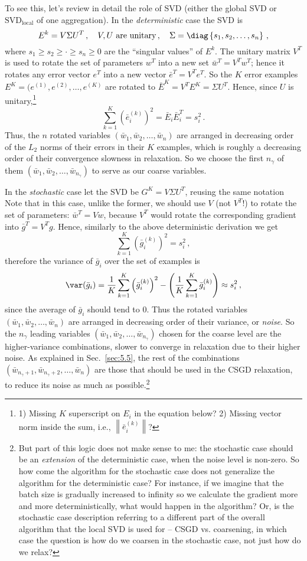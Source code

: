 \documentclass{article} %
\begin{document}
To see this, let's review in detail the role of SVD (either the global SVD or $\text{SVD}_{\text{local}}$ of one aggregation). In the {\it deterministic} case the SVD is
$$ E^k = V \Sigma U^T\,,\quad V, U \text{ are unitary}\,,\quad \Sigma = \diag\left\{s_1, s_2, \dots, s_n \right\}\,,$$
where $s_1 \geq s_2 \geq \cdot \geq s_n \geq 0$ are the ``singular values'' of $E^k$. The unitary matrix $V^T$ is used to rotate the set of parameters $w^T$ into a new set $\bar{w}^T = V^T w^T$; hence it rotates any error vector $e^T$ into a new vector $\bar{e}^T = V^T e^T$. So the $K$ error examples $E^K = (e^{(1)},e^{(2)},\dots,e^{(K)}$ are rotated to $\bar{E}^K = V^T E^K = \Sigma U^T$. Hence, since $U$ is unitary,\footnote{1) Missing $K$ superscript on $E_i$ in the equation below? 2) Missing vector norm inside the sum, i.e., $\left\|\bar{e}_i^{(k)}\right\|$?}
$$ \sum_{k=1}^K \left(\bar{e}_i^{(k)}\right)^2 = \bar{E}_i \bar{E}_i^T = s_i^2\,.$$
Thus, the $n$ rotated variables $(\bar{w}_1,\bar{w}_2,\dots,\bar{w}_n)$ are arranged in decreasing order of the $L_2$ norms of their errors in their $K$ examples, which is roughly a decreasing order of their convergence slowness in relaxation. So we choose the first $n_{\gamma}$ of them $(\bar{w}_1,\bar{w}_2,\dots,\bar{w}_{n_{\gamma}})$ to serve as our coarse variables.

In the {\it stochastic} case let the SVD be $G^K = V \Sigma U^T$, reusing the same notation Note that in this case, unlike the former, we should use $V$ (not $V^T$!) to rotate the set of parameters: $\bar{w}^T = V w$, because $V^T$ would rotate the corresponding gradient into $\bar{g}^T = V^T g$. Hence, similarly to the above deterministic derivation we get
$$ \sum_{k=1}^K \left(\bar{g}_i^{(k)}\right)^2 = s_i^2\,,$$
therefore the variance of $\bar{g}_i$ over the set of examples is
$$ \var(\bar{g}_i) = \frac{1}{K} \sum_{k=1}^K \left(\bar{g}_i^{(k)}\right)^2 - \left(\frac{1}{K} \sum_{k=1}^K \bar{g}_i^{(k)} \right) \approx s_i^2\,,$$
since the average of $\bar{g}_i$ should tend to $0$. Thus the rotated variables $(\bar{w}_1,\bar{w}_2,\dots,\bar{w}_n)$ are arranged in decreasing order of their variance, or {\it noise}. So the $n_{\gamma}$ leading variables $(\bar{w}_1,\bar{w}_2,\dots,\bar{w}_{n_{\gamma}})$ chosen for the coarse level are the higher-variance combinations, slower to converge in relaxation due to their higher noise. As explained in Sec.~\ref{sec:5.5}, the rest of the combinations $(\bar{w}_{n_{\gamma}+1},\bar{w}_{n_{\gamma}+2},\dots,\bar{w}_n)$ are those that should be used in the CSGD relaxation, to reduce its noise as much as possible.\footnote{But part of this logic does not make sense to me: the stochastic case should be an {\it extension} of the deterministic case, when the noise level is non-zero. So how come the algorithm for the stochastic case does not generalize the algorithm for the deterministic case? For instance, if we imagine that the batch size is gradually increased to infinity so we calculate the gradient more and more deterministically, what would happen in the algorithm? Or, is the stochastic case description referring to a different part of the overall algorithm that the local SVD is used for -- CSGD vs. coarsening, in which case the question is how do we coarsen in the stochastic case, not just how do we relax?}
\end{document}
